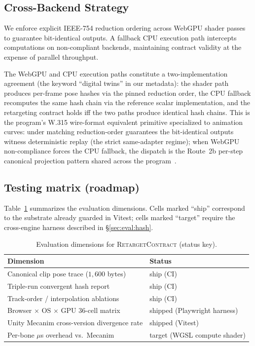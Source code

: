 \documentclass[sigconf,nonacm]{acmart}
\newcommand{\retargetcontract}{\textsc{RetargetContract}}
\begin{document}
\subsection{Cross-Backend Strategy}
We enforce explicit IEEE-754 reduction ordering across WebGPU shader passes to guarantee bit-identical outputs. A fallback CPU execution path intercepts computations on non-compliant backends, maintaining contract validity at the expense of parallel throughput. %

The WebGPU and CPU execution paths constitute a two-implementation
agreement (the keyword ``digital twins'' in our metadata): the
shader path produces per-frame pose hashes via the pinned reduction
order, the CPU fallback recomputes the same hash chain via the
reference scalar implementation, and the retargeting contract holds
iff the two paths produce identical hash chains. This is the
program's W.315 wire-format equivalent primitive specialized to
animation curves: under matching reduction-order guarantees the
bit-identical outputs witness deterministic replay (the strict
same-adapter regime); when WebGPU non-compliance forces the CPU
fallback, the dispatch is the Route~2b per-step canonical projection
pattern shared across the program~\cite{paper-0c-twin-test-2026-05-11}.

\subsection{Testing matrix (roadmap)}
Table~\ref{tab:matrix} summarizes the evaluation dimensions. Cells marked
``ship'' correspond to the substrate already guarded in Vitest; cells marked
``target'' require the cross-engine harness described in
\S\ref{sec:eval:hash}.

\begin{table}[t]
  \centering
  \caption{Evaluation dimensions for \retargetcontract{} (status key).}
  \label{tab:matrix}
  \small
  \begin{tabular}{@{}ll@{}}
    \toprule
    \textbf{Dimension} & \textbf{Status} \\
    \midrule
    Canonical clip pose trace ($1{,}600$ bytes) & ship (CI) \\
    Triple-run convergent hash report & ship (CI) \\
    Track-order / interpolation ablations & ship (CI) \\
    Browser $\times$ OS $\times$ GPU $36$-cell matrix & shipped (Playwright harness) \\
    Unity Mecanim cross-version divergence rate & shipped (Vitest) \\
    Per-bone $\mu$s overhead vs.\ Mecanim & target (WGSL compute shader) \\
    \bottomrule
  \end{tabular}
\end{table}
\end{document}
